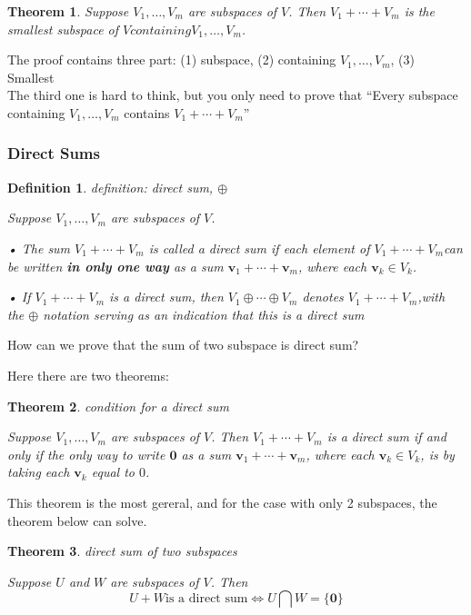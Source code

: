 \documentclass{article}
\newtheorem{theorem}{Theorem}[subsection]
\newtheorem{definition}{Definition}[subsection]
\newcommand{\ve}{\boldsymbol}
\begin{document}
\begin{CJK}{UTF8}{gkai}
\begin{theorem}
    Suppose $V_1,\ldots,V_m$ are subspaces of $V$. Then $V_1 + \cdots + V_m$ is the smallest
    subspace of $V containing V_1,\ldots,V_m$.
\end{theorem}

The proof contains three part: (1) subspace, (2) containing $V_1, \ldots , V_m$, (3) Smallest \\

The third one is hard to think, but you only need to prove that ``Every subspace containing $V_1,\ldots,V_m$ contains $V_1 + \cdots + V_m$''\\

\subsubsection{Direct Sums}

\begin{definition}
    definition: direct sum, $\oplus$

    Suppose $V_1,\ldots,V_m$ are subspaces of $V$.

    • The sum $V_1+ \cdots +V_m$ is called a direct sum if each element of $V_1+ \cdots +V_m$can be written \textbf{in only one way} as a sum $\ve{v}_1 + \cdots +\ve{v}_m$, where each $\ve{v}_k \in V_k$.

    • If $V_1 +\cdots+V_m$ is a direct sum, then $V_1 \oplus\cdots \oplus V_m$ denotes $V_1 +\cdots+V_m$,with the $\oplus$ notation serving as an indication that this is a direct sum
\end{definition}

How can we prove that the sum of two subspace is direct sum?

Here there are two theorems:

\begin{theorem}
    condition for a direct sum

 Suppose $V_1,\ldots,V_m$ are subspaces of $V$. Then $V_1 + \cdots +V_m$ is a direct sum if
 and only if the only way to write $\ve{0}$ as a sum $\ve{v}_1 +\cdots+\ve{v}_m$, where each $\ve{v}_k \in V_k$,
 is by taking each $\ve{v}_k$ equal to $0$.
\end{theorem}

This theorem is the most gereral, and for the case with only 2 subspaces, the theorem below can solve.

\begin{theorem}
    direct sum of two subspaces

    Suppose $U$ and $W$ are subspaces of $V$. Then
 \[U + W \text{is a direct sum} \Leftrightarrow U\bigcap W =\{\ve{0}\}\]
\end{theorem}


\end{CJK}
\end{document}
